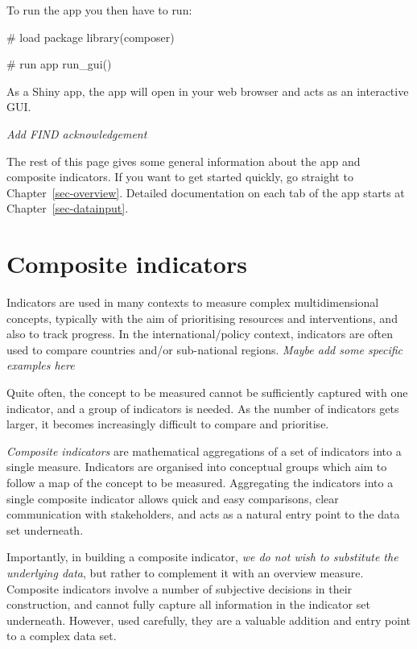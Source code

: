\documentclass[
  letterpaper,
  DIV=11,
  numbers=noendperiod]{scrreprt}
\newenvironment{Shaded}{\begin{snugshade}}{\end{snugshade}}
\newcommand{\CommentTok}[1]{\textcolor[rgb]{0.37,0.37,0.37}{#1}}
\newcommand{\FunctionTok}[1]{\textcolor[rgb]{0.28,0.35,0.67}{#1}}
\newcommand{\NormalTok}[1]{\textcolor[rgb]{0.00,0.23,0.31}{#1}}
\begin{document}
To run the app you then have to run:

\begin{Shaded}
\begin{Highlighting}[]
\CommentTok{\# load package}
\FunctionTok{library}\NormalTok{(composer)}

\CommentTok{\# run app}
\FunctionTok{run\_gui}\NormalTok{()}
\end{Highlighting}
\end{Shaded}

As a Shiny app, the app will open in your web browser and acts as an
interactive GUI.

\emph{Add FIND acknowledgement}

The rest of this page gives some general information about the app and
composite indicators. If you want to get started quickly, go straight to
Chapter~\ref{sec-overview}. Detailed documentation on each tab of the
app starts at Chapter~\ref{sec-datainput}.

\hypertarget{composite-indicators}{%
\section{Composite indicators}\label{composite-indicators}}

Indicators are used in many contexts to measure complex multidimensional
concepts, typically with the aim of prioritising resources and
interventions, and also to track progress. In the international/policy
context, indicators are often used to compare countries and/or
sub-national regions. \emph{Maybe add some specific examples here}

Quite often, the concept to be measured cannot be sufficiently captured
with one indicator, and a group of indicators is needed. As the number
of indicators gets larger, it becomes increasingly difficult to compare
and prioritise.

\emph{Composite indicators} are mathematical aggregations of a set of
indicators into a single measure. Indicators are organised into
conceptual groups which aim to follow a map of the concept to be
measured. Aggregating the indicators into a single composite indicator
allows quick and easy comparisons, clear communication with
stakeholders, and acts as a natural entry point to the data set
underneath.

Importantly, in building a composite indicator, \emph{we do not wish to
substitute the underlying data}, but rather to complement it with an
overview measure. Composite indicators involve a number of subjective
decisions in their construction, and cannot fully capture all
information in the indicator set underneath. However, used carefully,
they are a valuable addition and entry point to a complex data set.
\end{document}
